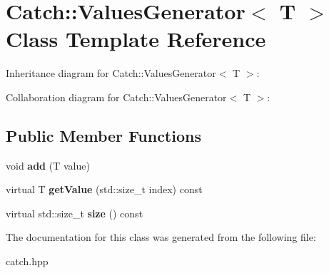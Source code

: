 \hypertarget{class_catch_1_1_values_generator}{}\section{Catch\+:\+:Values\+Generator$<$ T $>$ Class Template Reference}
\label{class_catch_1_1_values_generator}


Inheritance diagram for Catch\+:\+:Values\+Generator$<$ T $>$\+:


Collaboration diagram for Catch\+:\+:Values\+Generator$<$ T $>$\+:
\subsection*{Public Member Functions}
\begin{DoxyCompactItemize}
\item 
\mbox{\label{class_catch_1_1_values_generator_a8412c8ce5d9d4fc6ff06d5246d56d538}} 
void {\bfseries add} (T value)
\item 
\mbox{\label{class_catch_1_1_values_generator_a9674c8b70d562d2d68154de92dd1810a}} 
virtual T {\bfseries get\+Value} (std\+::size\+\_\+t index) const
\item 
\mbox{\label{class_catch_1_1_values_generator_a9aa5b140ee502975cf35115e534ab771}} 
virtual std\+::size\+\_\+t {\bfseries size} () const
\end{DoxyCompactItemize}


The documentation for this class was generated from the following file\+:\begin{DoxyCompactItemize}
\item 
catch.\+hpp\end{DoxyCompactItemize}
